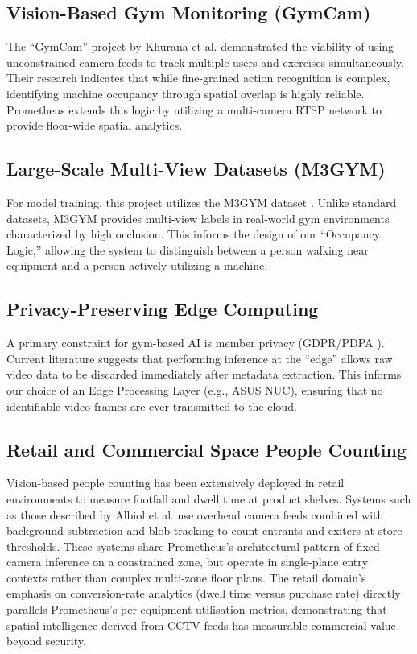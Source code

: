 \subsection{Vision-Based Gym Monitoring (GymCam)}
The ``GymCam'' project by Khurana et al. demonstrated the viability of using unconstrained camera feeds to track multiple users and exercises simultaneously. Their research indicates that while fine-grained action recognition is complex, identifying machine occupancy through spatial overlap is highly reliable. Prometheus extends this logic by utilizing a multi-camera RTSP network to provide floor-wide spatial analytics.

\subsection{Large-Scale Multi-View Datasets (M3GYM)}
For model training, this project utilizes the M3GYM dataset \cite{m3gym:dataset}. Unlike standard datasets, M3GYM provides multi-view labels in real-world gym environments characterized by high occlusion. This informs the design of our ``Occupancy Logic,'' allowing the system to distinguish between a person walking near equipment and a person actively utilizing a machine.

\subsection{Privacy-Preserving Edge Computing}
A primary constraint for gym-based AI is member privacy (GDPR/PDPA \cite{thailand:pdpa}). Current literature suggests that performing inference at the ``edge'' allows raw video data to be discarded immediately after metadata extraction. This informs our choice of an Edge Processing Layer (e.g., ASUS NUC), ensuring that no identifiable video frames are ever transmitted to the cloud.

\subsection{Retail and Commercial Space People Counting}
Vision-based people counting has been extensively deployed in retail environments to measure footfall and dwell time at product shelves. Systems such as those described by Albiol et al. use overhead camera feeds combined with background subtraction and blob tracking to count entrants and exiters at store thresholds. These systems share Prometheus's architectural pattern of fixed-camera inference on a constrained zone, but operate in single-plane entry contexts rather than complex multi-zone floor plans. The retail domain's emphasis on conversion-rate analytics (dwell time versus purchase rate) directly parallels Prometheus's per-equipment utilisation metrics, demonstrating that spatial intelligence derived from CCTV feeds has measurable commercial value beyond security.

